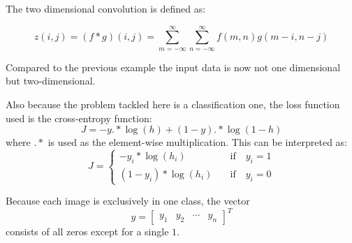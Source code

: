 \documentclass[11pt]{article}
\begin{document}
The two dimensional convolution is defined as:

\begin{equation}
   z(i,j) = (f*g)(i,j) = \sum_{m=-\infty}^{\infty} \sum_{n=-\infty}^{\infty} f(m,n) g(m-i,n-j)
\end{equation}

Compared to the previous example the input data is now not one dimensional but two-dimensional.

Also because the problem tackled here is a classification one, the loss function used is the cross-entropy function:
\begin{equation}
    J = - y .* \log(h) + (1-y) .* \log(1-h)
\end{equation}
where $.*$ is used as the element-wise multiplication. This can be interpreted as:
\begin{equation}
    J = \begin{cases}
        - y_i * \log(h_i)       \quad &\text{if} \quad y_i = 1 \\
        (1 - y_i) * \log(h_i)   \quad &\text{if} \quad y_i = 0
    \end{cases}
\end{equation}
    
Because each image is exclusively in one class, the vector 
\begin{equation}
y = \begin{bmatrix}
    y_1 & y_2 & \cdots & y_n
\end{bmatrix}^T
\end{equation}
consists of all zeros except for a single $1$.

 
\end{document}
